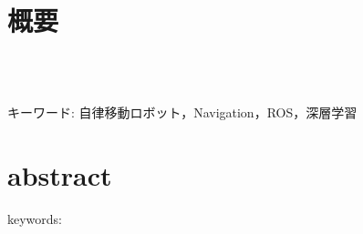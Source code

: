 \chapter*{概要}
\thispagestyle{empty}
%
\begin{center}
  \scalebox{1.5}{移動ロボットのための深層学習を用いた}\\
  \scalebox{1.5}{歩行者の位置予測とナビゲーションへの応用}\\
\end{center}
\vspace{1.0zh}
%


キーワード: 自律移動ロボット，Navigation，ROS，深層学習
%
\newpage
\chapter*{abstract}
\thispagestyle{empty}
%
\begin{center}
  \scalebox{1.3}{title}
\end{center}
\vspace{1.0zh}
%


keywords: 
